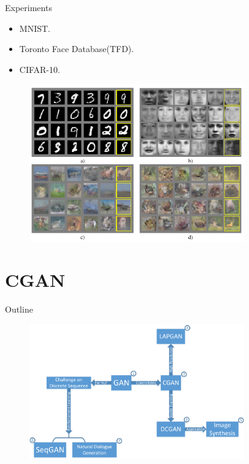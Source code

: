 \documentclass[10pt]{beamer}
\newcommand{\subtitlepage}[3]{\title{#1}\subtitle{#2}\author{#3}\date{}\begin{frame}[plain]\titlepage\end{frame}}
\begin{document}
	\begin{frame}{Experiments}
		\begin{itemize}
			\item MNIST.
			\item Toronto Face Database(TFD).
			\item CIFAR-10.
		\end{itemize}
		\begin{figure}
			\includegraphics[width=25em]{figures/GAN-experiment-demo-pic.png}
		\end{figure}
	\end{frame}

	\part{CGAN}
	\begin{frame}{Outline}
		\begin{figure}
			\includegraphics[width=25em]{figures/outline.png}
		\end{figure}
	\end{frame}
	\subtitlepage{}{Conditional Generative Adversarial Nets}{Mehdi Mirza, Simon Osindero\\arXiv: 1411.1784}
	
\end{document}
